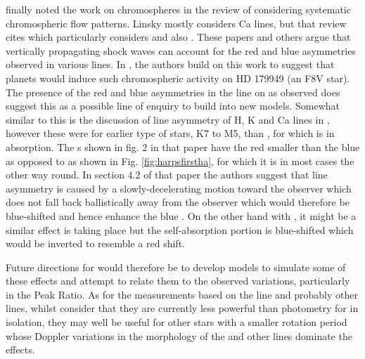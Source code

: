 {\FirstP} finally noted the work on chromospheres in the review of \citet[Section VII]{linsky80} considering systematic
chromospheric flow patterns. Linsky mostly considers Ca lines, but that review cites \citet{athay70} which particularly
considers {\ha} and also \citet{athay70a}. These papers and others argue that vertically propagating shock waves can
account for the red and blue asymmetries observed in various lines. In \citet{shkolnik03}, the authors build on this
work to suggest that planets would induce such chromospheric activity on HD 179949 (an F8V star). The presence of the
red and blue asymmetries in the {\ha} line on {\prox} as {\Firstp} observed does suggest this as a possible line of
enquiry to build into new models. Somewhat similar to this is the discussion of line asymmetry of H, K and Ca lines in
\citet{rauscher06}, however these were for earlier type of stars, K7 to M5, than \prox, for which {\ha} is in
absorption. The \horn s shown in fig. 2 in that paper have the red {\horn} smaller than the blue {\horn} as opposed to
{\prox} as shown in Fig. \ref{fig:harpsfirstha}, for which it is in most cases the other way round. In section 4.2 of
that paper the authors suggest that line asymmetry is caused by a slowly-decelerating motion toward the observer which
does not fall back ballistically away from the observer which would therefore be blue-shifted and hence enhance the blue
\horn. On the other hand with \prox, it might be a similar effect is taking place but the self-absorption portion is
blue-shifted which would be inverted to resemble a red shift.

Future directions for {\prox} would therefore be to develop models to simulate some of these effects and attempt to
relate them to the observed variations, particularly in the Peak Ratio. As for the measurements based on the {\ha} line
and probably other lines, whilst {\Firstp} consider that they are currently less powerful than photometry for {\prox} in
isolation, they may well be useful for other stars with a smaller rotation period whose Doppler variations in the
morphology of the {\ha} and other lines dominate the effects.

